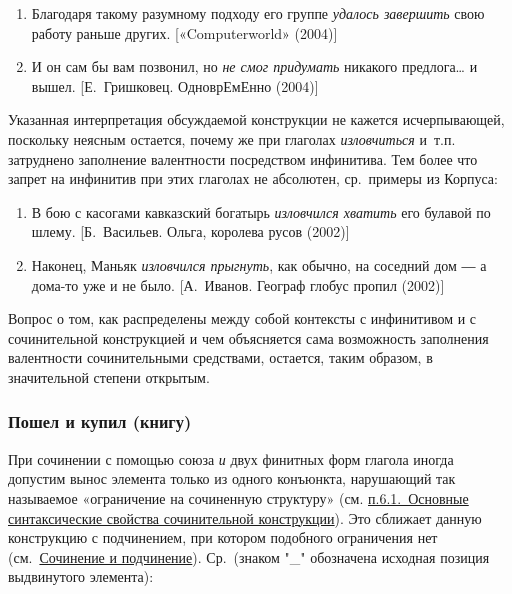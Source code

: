 \begin{enumerate}
  \def\labelenumi{(\arabic{enumi})}
  \setcounter{enumi}{51}
  \item
        Благодаря такому разумному подходу его группе \textit{удалось завершить}
        свою работу раньше других. {[}«Computerworld» (2004){]}
  \item
        И он сам бы вам позвонил, но \textit{не смог придумать} никакого
        предлога\ldots{} и вышел. {[}Е.~Гришковец. ОдноврЕмЕнно (2004){]}
\end{enumerate}

Указанная интерпретация обсуждаемой конструкции не кажется
исчерпывающей, поскольку неясным остается, почему же при глаголах
\textit{изловчиться} и~т.п. затруднено заполнение валентности посредством
инфинитива. Тем более что запрет на инфинитив при этих глаголах не
абсолютен, ср.~примеры из Корпуса:

\begin{enumerate}
  \def\labelenumi{(\arabic{enumi})}
  \setcounter{enumi}{53}
  \item
        В бою с касогами кавказский богатырь \textit{изловчился хватить} его
        булавой по шлему. {[}Б.~Васильев. Ольга, королева русов (2002){]}
  \item
        Наконец, Маньяк \textit{изловчился прыгнуть}, как обычно, на соседний
        дом ― а дома-то уже и не было. {[}А.~Иванов. Географ глобус пропил
        (2002){]}
\end{enumerate}

Вопрос о том, как распределены между собой контексты с инфинитивом и с
сочинительной конструкцией и чем объясняется сама возможность заполнения
валентности сочинительными средствами, остается, таким образом, в
значительной степени открытым.

\subsubsection{Пошел и купил
  (книгу)}\label{ux43fux43eux448ux435ux43b-ux438-ux43aux443ux43fux438ux43b-ux43aux43dux438ux433ux443}

При сочинении с помощью союза \textit{и} двух финитных форм глагола иногда
допустим вынос элемента только из одного конъюнкта, нарушающий так
называемое «ограничение на сочиненную структуру» (см.
\underline{п.6.1.~Основные синтаксические свойства сочинительной
  конструкции}). Это сближает данную конструкцию с подчинением, при
котором подобного ограничения нет (см.~\underline{Сочинение и
  подчинение}). Ср.~(знаком "\_" обозначена исходная позиция выдвинутого
элемента):

